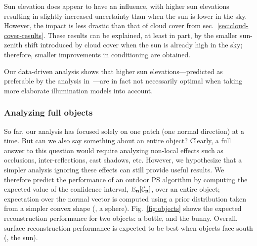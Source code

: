 Sun elevation does appear to have an influence, with higher sun elevations resulting in slightly increased uncertainty than when the sun is lower in the sky. However, the impact is less drastic than that of cloud cover from sec.~\ref{sec:cloud-cover-results}. These results can be explained, at least in part, by the smaller sun-zenith shift introduced by cloud cover when the sun is already high in the sky; therefore, smaller improvements in conditioning are obtained.

Our data-driven analysis shows that higher sun elevations---predicted as preferable by the analysis in~\cite{shen-pg-14}---are in fact not necessarily optimal when taking more elaborate illumination models into account.




\subsubsection{Analyzing full objects}

So far, our analysis has focused solely on one patch (one normal direction) at a time. But can we also say something about an entire object? Clearly, a full answer to this question would require analyzing non-local effects such as occlusions, inter-reflections, cast shadows, etc. However, we hypothesize that a simpler analysis ignoring these effects can still provide useful results. We therefore predict the performance of an outdoor PS algorithm by computing the expected value of the confidence interval, $\mathbb{E}_{\bf n}[\mathcal{C}_{\bf n}]$, over an entire object; expectation over the normal vector is computed using a prior distribution taken from a simpler convex shape (\eg, a sphere). Fig.~\ref{fig:objects} shows the expected reconstruction performance for two objects: a bottle, and the bunny. Overall, surface reconstruction performance is expected to be best when objects face south (\ie, the sun).

